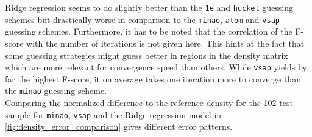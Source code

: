 \begin{table}[h]
    \centering
    \caption{Comparison of different guessing schemes for 102 (20\%) test samples from the  subset from QM9 \parencite{ref:article1_qm9}. The F-score is calculated using the Fock matrix prediction from the Ridge regression model and various guessing schemes implemented in \textsc{PySCF}. The number of iterations until convergence is shown as well as the percentage samples not converging within 50 iterations and the inference time as a factor of the inference time of the minao guess.}
    \label{tab:ridge_metrics}
\end{table}
Ridge regression seems to do slightly better than the \texttt{1e} and \texttt{huckel} guessing schemes but drastically worse in comparison to the \texttt{minao}, \texttt{atom} and \texttt{vsap} guessing schemes. Furthermore, it has to be noted that the correlation of the F-score with the number of iterations is not given here. This hints at the fact that some guessing strategies might guess better in regions in the density matrix which are more relevant for convergence speed than others. While \texttt{vsap} yields by far the highest F-score, it on average takes one iteration more to converge than the \texttt{minao} guessing scheme. \\
Comparing the normalized difference to the reference density for the 102 test sample for \texttt{minao}, \texttt{vsap} and the Ridge regression model in \autoref{fig:density_error_comparison} gives different error patterns.  


